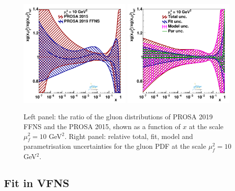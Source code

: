 \documentclass[12pt]{article}
\begin{document}
\begin{figure}
    \centering
    \includegraphics[width=0.49\textwidth]{figs/q2_10_pdf_g_ratio.pdf}
    \includegraphics[width=0.49\textwidth]{figs/gluonunc.pdf}
    \caption{Left panel: the ratio of the gluon distributions of PROSA 2019 FFNS and the PROSA 2015, shown as a function of $x$ at the scale $\mu^2_f=10$ GeV$^2$. Right panel: relative total, fit, model and parametrisation uncertainties for the gluon PDF at the scale $\mu^2_f=10$ GeV$^2$.}
    \label{fig:pdfratios}
\end{figure}


\subsection{Fit in VFNS}
\label{sec:vfns}
\end{document}
